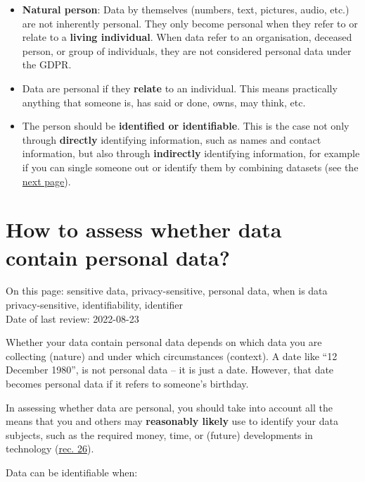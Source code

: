 \documentclass[
]{book}
\providecommand{\tightlist}{%
  \setlength{\itemsep}{0pt}\setlength{\parskip}{0pt}}
\begin{document}
\begin{itemize}
\tightlist
\item
  \textbf{Natural person}: Data by themselves (numbers, text, pictures, audio, etc.)
  are not inherently personal. They only become personal when they refer to or
  relate to a \textbf{living individual}. When data refer to an organisation,
  deceased person, or group of individuals, they are not considered personal data
  under the GDPR.
\item
  Data are personal if they \textbf{relate} to an individual. This means practically
  anything that someone is, has said or done, owns, may think, etc.
\item
  The person should be \textbf{identified or identifiable}. This is the case not
  only through \textbf{directly} identifying information, such as names and contact
  information, but also through \textbf{indirectly} identifying information, for
  example if you can single someone out or identify them by combining datasets
  (see the \protect\hyperlink{personal-data-assess}{next page}).
\end{itemize}

\hypertarget{personal-data-assess}{%
\section{How to assess whether data contain personal data?}\label{personal-data-assess}}

On this page: sensitive data, privacy-sensitive, personal data, when is data
privacy-sensitive, identifiability, identifier\\
Date of last review: 2022-08-23

Whether your data contain personal data depends on which data you are
collecting (nature) and under which circumstances (context). A date like
``12 December 1980'', is not personal data -- it is just a date. However, that
date becomes personal data if it refers to someone's birthday.

In assessing whether data are personal, you should take into account all the
means that you and others may \textbf{reasonably likely} use to identify your data
subjects, such as the required money, time, or (future) developments in
technology (\href{https://gdpr-info.eu/recitals/no-26/}{rec. 26}).

Data can be identifiable when:
\end{document}
